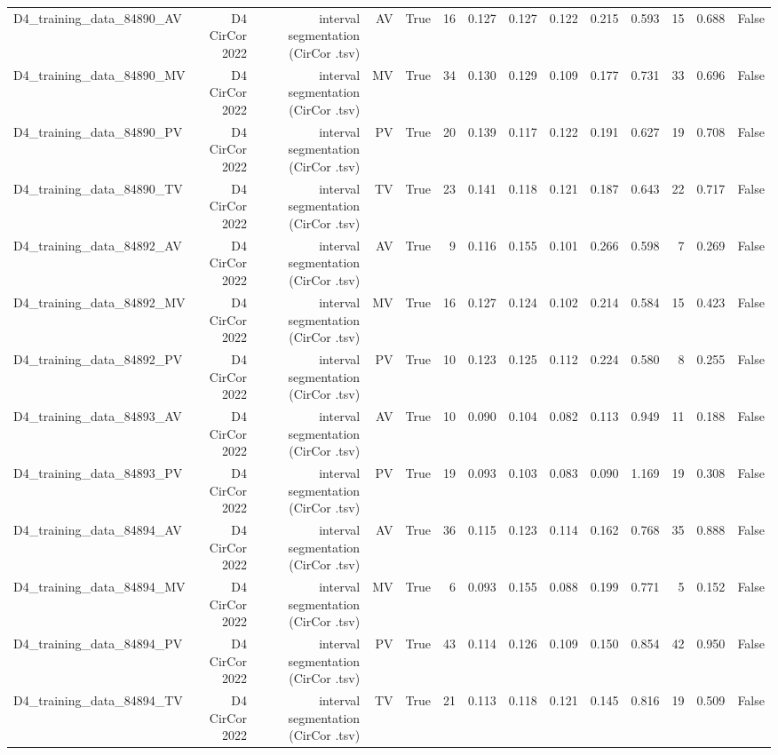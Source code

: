 \begin{table}[htbp]
\begin{tabular}{lrrrrrrrrrrrrr}
    D4\_training\_data\_84890\_AV & D4 CirCor 2022 & interval segmentation (CirCor .tsv) & AV & True & 16 & 0.127 & 0.127 & 0.122 & 0.215 & 0.593 & 15 & 0.688 & False \\
    D4\_training\_data\_84890\_MV & D4 CirCor 2022 & interval segmentation (CirCor .tsv) & MV & True & 34 & 0.130 & 0.129 & 0.109 & 0.177 & 0.731 & 33 & 0.696 & False \\
    D4\_training\_data\_84890\_PV & D4 CirCor 2022 & interval segmentation (CirCor .tsv) & PV & True & 20 & 0.139 & 0.117 & 0.122 & 0.191 & 0.627 & 19 & 0.708 & False \\
    D4\_training\_data\_84890\_TV & D4 CirCor 2022 & interval segmentation (CirCor .tsv) & TV & True & 23 & 0.141 & 0.118 & 0.121 & 0.187 & 0.643 & 22 & 0.717 & False \\
    D4\_training\_data\_84892\_AV & D4 CirCor 2022 & interval segmentation (CirCor .tsv) & AV & True & 9 & 0.116 & 0.155 & 0.101 & 0.266 & 0.598 & 7 & 0.269 & False \\
    D4\_training\_data\_84892\_MV & D4 CirCor 2022 & interval segmentation (CirCor .tsv) & MV & True & 16 & 0.127 & 0.124 & 0.102 & 0.214 & 0.584 & 15 & 0.423 & False \\
    D4\_training\_data\_84892\_PV & D4 CirCor 2022 & interval segmentation (CirCor .tsv) & PV & True & 10 & 0.123 & 0.125 & 0.112 & 0.224 & 0.580 & 8 & 0.255 & False \\
    D4\_training\_data\_84893\_AV & D4 CirCor 2022 & interval segmentation (CirCor .tsv) & AV & True & 10 & 0.090 & 0.104 & 0.082 & 0.113 & 0.949 & 11 & 0.188 & False \\
    D4\_training\_data\_84893\_PV & D4 CirCor 2022 & interval segmentation (CirCor .tsv) & PV & True & 19 & 0.093 & 0.103 & 0.083 & 0.090 & 1.169 & 19 & 0.308 & False \\
    D4\_training\_data\_84894\_AV & D4 CirCor 2022 & interval segmentation (CirCor .tsv) & AV & True & 36 & 0.115 & 0.123 & 0.114 & 0.162 & 0.768 & 35 & 0.888 & False \\
    D4\_training\_data\_84894\_MV & D4 CirCor 2022 & interval segmentation (CirCor .tsv) & MV & True & 6 & 0.093 & 0.155 & 0.088 & 0.199 & 0.771 & 5 & 0.152 & False \\
    D4\_training\_data\_84894\_PV & D4 CirCor 2022 & interval segmentation (CirCor .tsv) & PV & True & 43 & 0.114 & 0.126 & 0.109 & 0.150 & 0.854 & 42 & 0.950 & False \\
    D4\_training\_data\_84894\_TV & D4 CirCor 2022 & interval segmentation (CirCor .tsv) & TV & True & 21 & 0.113 & 0.118 & 0.121 & 0.145 & 0.816 & 19 & 0.509 & False \\

\end{tabular}
\end{table}
